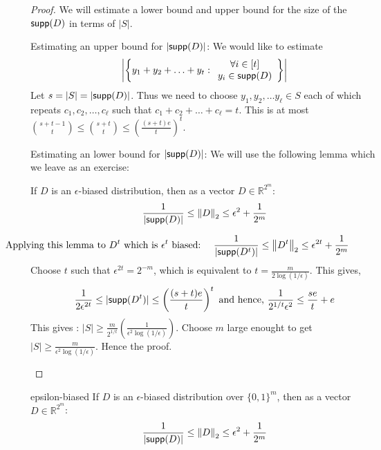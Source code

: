 \begin{proof}
\noindent We will estimate a lower bound and upper bound for the size of the ${\mathsf{supp}}(D)$ in terms of $|S|$.
\begin{description}
\item{\sf Estimating an upper bound for $|{\mathsf{supp}}(D)|$}:
We would like to estimate 
$$\left|\left\{ y_1+y_2+\ldots+y_t :
\begin{array}{c}
\forall i \in [t]\\ 
y_i \in {\mathsf{supp}}(D) 
\end{array}
\right\} \right|$$
Let $s = |S| = |{\mathsf{supp}}(D)|$. Thus we need to choose $y_1, y_2, \ldots y_\ell \in S$ each of which repeats $c_1, c_2, \ldots, c_\ell$ such that $c_1+c_2+\ldots+c_\ell = t$. This is at most ${s+t-1 \choose t} \le {s+t \choose t} \le \left(\frac{(s+t)e}{t}\right)^t$.
\item{\sf Estimating an lower bound for $|{\mathsf{supp}}(D)|$}:
We will use the following lemma which we leave as an exercise:
\begin{lemma}
If $D$ is an $\epsilon$-biased distribution, then as a vector $D \in \mathbb{R}^{2^m}$:
$$ \frac{1}{|{\mathsf{supp}}(D)|} \le {\left\lVert D\right\rVert}_2 \le \epsilon^2+\frac{1}{2^m}$$
\end{lemma}
\vspace{-5mm}
$$\hspace{-21mm}\textrm{ Applying this lemma to $D^t$ which is $\epsilon^t$ biased:~~~~}
\frac{1}{|\supp(D^t)|} \le \norm{D^t} \le \epsilon^{2t}+\frac{1}{2^m}$$
Choose $t$ such that $\epsilon^{2t} = 2^{-m}$, which is equivalent to $t = \frac{m}{2\log(1/\epsilon)}$.
This gives, 
$$\frac{1}{2\epsilon^{2t}} \le |{\mathsf{supp}}(D^t)| \le \left(\frac{(s+t)e}{t}\right)^t \textrm{ and hence, }
\frac{1}{2^{1/t}\epsilon^{2}} \le \frac{se}{t}+e$$
This gives : $|S| \ge \frac{m}{2^{1/t}}\left(\frac{1}{\epsilon^2 \log(1/\epsilon)}\right)$. Choose $m$ large enought to get $|S| \ge \frac{m}{\epsilon^2 \log(1/\epsilon)}$. Hence the proof.
\end{description}
\end{proof}

\begin{exercise-prob}
\begin{show-ps4}{epsilon-biased}
If $D$ is an $\epsilon$-biased distribution over $\{0,1\}^m$, then as a vector $D \in \mathbb{R}^{2^m}$:
$$ \frac{1}{|{\mathsf{supp}}(D)|} \le {\left\lVert D\right\rVert}_2 \le \epsilon^2+\frac{1}{2^m}$$
\end{show-ps4}
\end{exercise-prob}


